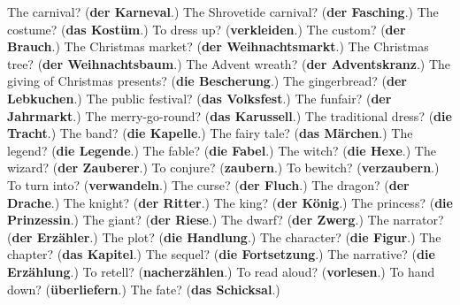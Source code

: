 \begin{tcolorbox}[breakable,colback=teal!4,colframe=teal!35!black,title={Before you move on}]
The carnival? (\textbf{der Karneval}.) The Shrovetide carnival? (\textbf{der Fasching}.) The costume? (\textbf{das Kostüm}.) To dress up? (\textbf{verkleiden}.) The custom? (\textbf{der Brauch}.) The Christmas market? (\textbf{der Weihnachtsmarkt}.) The Christmas tree? (\textbf{der Weihnachtsbaum}.) The Advent wreath? (\textbf{der Adventskranz}.) The giving of Christmas presents? (\textbf{die Bescherung}.) The gingerbread? (\textbf{der Lebkuchen}.) The public festival? (\textbf{das Volksfest}.) The funfair? (\textbf{der Jahrmarkt}.) The merry-go-round? (\textbf{das Karussell}.) The traditional dress? (\textbf{die Tracht}.) The band? (\textbf{die Kapelle}.) The fairy tale? (\textbf{das Märchen}.) The legend? (\textbf{die Legende}.) The fable? (\textbf{die Fabel}.) The witch? (\textbf{die Hexe}.) The wizard? (\textbf{der Zauberer}.) To conjure? (\textbf{zaubern}.) To bewitch? (\textbf{verzaubern}.) To turn into? (\textbf{verwandeln}.) The curse? (\textbf{der Fluch}.) The dragon? (\textbf{der Drache}.) The knight? (\textbf{der Ritter}.) The king? (\textbf{der König}.) The princess? (\textbf{die Prinzessin}.) The giant? (\textbf{der Riese}.) The dwarf? (\textbf{der Zwerg}.) The narrator? (\textbf{der Erzähler}.) The plot? (\textbf{die Handlung}.) The character? (\textbf{die Figur}.) The chapter? (\textbf{das Kapitel}.) The sequel? (\textbf{die Fortsetzung}.) The narrative? (\textbf{die Erzählung}.) To retell? (\textbf{nacherzählen}.) To read aloud? (\textbf{vorlesen}.) To hand down? (\textbf{überliefern}.) The fate? (\textbf{das Schicksal}.)
\end{tcolorbox}
